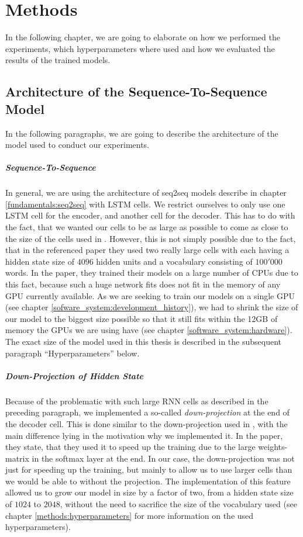 \chapter{Methods}
\label{methods}
In the following chapter, we are going to elaborate on how we performed the experiments, which hyperparameters where used and how we evaluated the results of the trained models.

\section{Architecture of the Sequence-To-Sequence Model}
In the following paragraphs, we are going to describe the architecture of the model used to conduct our experiments.

\paragraph{Sequence-To-Sequence} In general, we are using the architecture of seq2seq models describe in chapter \ref{fundamentals:seq2seq} with LSTM cells. We restrict ourselves to only use one LSTM cell for the encoder, and another cell for the decoder. This has to do with the fact, that we wanted our cells to be as large as possible to come as close to the size of the cells used in \cite{Vinyals:2015}. However, this is not simply possible due to the fact, that in the referenced paper they used two really large cells with each having a hidden state size of $4096$ hidden units and a vocabulary consisting of $100'000$ words. In the paper, they trained their models on a large number of CPUs due to this fact, because such a huge network fits does not fit in the memory of any GPU currently available. As we are seeking to train our models on a single GPU (see chapter \ref{sofware_system:development_history}), we had to shrink the size of our model to the biggest size possible so that it still fits within the 12GB of memory the GPUs we are using have (see chapter \ref{software_system:hardware}). The exact size of the model used in this thesis is described in the subsequent paragraph ``Hyperparameters'' below.

\paragraph{Down-Projection of Hidden State} Because of the problematic with such large RNN cells as described in the preceding paragraph, we implemented a so-called \emph{down-projection} at the end of the decoder cell. This is done similar to the down-projection used in \cite{Vinyals:2015}, with the main difference lying in the motivation why we implemented it. In the paper, they state, that they used it to speed up the training due to the large weights-matrix in the softmax layer at the end. In our case, the down-projection was not just for speeding up the training, but mainly to allow us to use larger cells than we would be able to without the projection. The implementation of this feature allowed us to grow our model in size by a factor of two, from a hidden state size of $1024$ to $2048$, without the need to sacrifice the size of the vocabulary used (see chapter \ref{methods:hyperparameters} for more information on the used hyperparameters).

